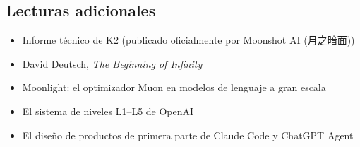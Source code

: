 \subsection{Lecturas adicionales}

\begin{itemize}
    \item Informe técnico de K2 (publicado oficialmente por Moonshot AI (月之暗面))
    \item David Deutsch, \textit{The Beginning of Infinity}
    \item Moonlight: el optimizador Muon en modelos de lenguaje a gran escala
    \item El sistema de niveles L1--L5 de OpenAI
    \item El diseño de productos de primera parte de Claude Code y ChatGPT Agent
\end{itemize}



